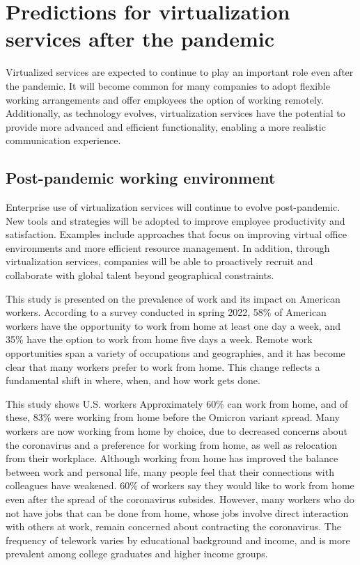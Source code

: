 \documentclass[12pt]{article}
\begin{document}
\section{Predictions for virtualization services after the pandemic}
Virtualized services are expected to continue to play an
important role even after the pandemic. It will become common for many
companies to adopt flexible working arrangements and offer employees the option
of working remotely. Additionally, as technology evolves, virtualization
services have the potential to provide more advanced and efficient
functionality, enabling a more realistic communication experience.

\subsection{Post-pandemic working environment}
Enterprise use of virtualization services will continue to evolve
post-pandemic. New tools and strategies will be adopted to improve employee
productivity and satisfaction. Examples include approaches that focus on
improving virtual office environments and more efficient resource management.
In addition, through virtualization services, companies will be able to
proactively recruit and collaborate with global talent beyond geographical
constraints.

This study \cite{americans_embracing} is presented on the prevalence of work
and its
impact on American
workers. According to a survey conducted in spring 2022, 58\% of American
workers have the opportunity to work from home at least one day a week, and
35\% have the option to work from home five days a week. Remote work
opportunities span a variety of occupations and geographies, and it has become
clear that many workers prefer to work from home. This change reflects a
fundamental shift in where, when, and how work gets done.

This study \cite{covid_reshaping} shows U.S. workers Approximately 60\% can
work
from home, and of these, 83\% were
working from home before the Omicron variant spread. Many workers are now
working from home by choice, due to decreased concerns about the coronavirus
and a preference for working from home, as well as relocation from their
workplace. Although working from home has improved the balance between work and
personal life, many people feel that their connections with colleagues have
weakened. 60\% of workers say they would like to work from home even after the
spread of the coronavirus subsides. However, many workers who do not have jobs
that can be done from home, whose jobs involve direct interaction with others
at work, remain concerned about contracting the coronavirus. The frequency of
telework varies by educational background and income, and is more prevalent
among college graduates and higher income groups.
\end{document}
